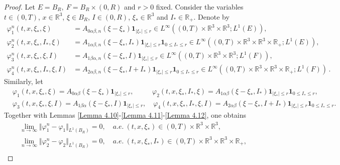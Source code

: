 \documentclass[10pt,a4paper]{amsart}
\def\R{\mathbb{R}}
\begin{document}
\begin{proof}

Let $E=B_R,\ F=B_R\times (0,R)$ and $r > 0$ fixed. Consider the variables $t \in (0, T)$, $x \in \R^3$, $\xi \in B_R$, $I \in (0, R)$, $\xi_* \in \R^3$ and $I_* \in \R_+$. Denote by
\begin{equation*}
	\begin{aligned}
		\varphi^n_1 (t, x, \xi_*, \xi) & = A_{0\alpha \beta ,n}(\xi -\xi_* ) \mathbf{1}_{|\xi_* |\leq r} \in L^\infty ((0,T)\times \R^3 \times \R^3; L^1(E)), \\
		\varphi^n_2 (t, x, \xi_*, I_*,\xi) & = A_{1\alpha \beta ,n}(\xi -\xi_* ,I_* ) \mathbf{1}_{|\xi_* |\leq r} \mathbf{1}_{0 \leq I_* \leq r} \in L^\infty ((0,T)\times \R^3 \times \R^3 \times \R_+; L^1(E)),\\
		\varphi^n_3 (t, x, \xi_*, \xi, I) & = A_{1\beta \alpha ,n}(\xi -\xi_* ,I) \mathbf{1}_{|\xi_* |\leq r} \in L^\infty ((0,T)\times \R^3 \times \R^3; L^1(F)), \\
		\varphi^n_4 (t, x, \xi_*, I_*, \xi, I) & = A_{2\alpha \beta ,n}(\xi -\xi_* ,I+I_* ) \mathbf{1}_{|\xi_* |\leq r} \mathbf{1}_{0 \leq I_* \leq r} \in L^\infty ((0,T)\times \R^3 \times \R^3\times \R_+; L^1(F)) \,.
	\end{aligned}
\end{equation*}
Similarly, let
\begin{equation*}
	\begin{aligned}
		& \varphi_1 (t, x, \xi_*, \xi) = A_{0\alpha \beta }(\xi -\xi_* ) \mathbf{1}_{|\xi_* |\leq r}, \quad \quad \ \ \, \varphi_2 (t, x, \xi_*, I_*, \xi ) = A_{1\alpha \beta }(\xi -\xi_* ,I_* ) \mathbf{1}_{|\xi_* |\leq r} \mathbf{1}_{0 \leq I_* \leq r}, \\
		&\varphi_3 (t, x, \xi_*, \xi, I) = A_{1\beta \alpha}(\xi -\xi_* ,I) \mathbf{1}_{|\xi_* |\leq r}, \quad \varphi_4 (t, x, \xi_*, I_*, \xi, I ) = A_{2\alpha \beta }(\xi -\xi_* ,I+I_* ) \mathbf{1}_{|\xi_* |\leq r} \mathbf{1}_{0 \leq I_* \leq r}.
	\end{aligned}
\end{equation*}
Together with Lemmas \ref{Lemma 4.10}-\ref{Lemma 4.11}-\ref{Lemma 4.12}, one obtains  
\begin{equation*}
	\begin{aligned}
		& \lim \limits_{n\rightarrow \infty } \Vert \varphi^n_1 -\varphi_1 \Vert_{L^1(B_R)}=0, \quad a.e. \ (t,x,\xi_*) \in (0,T) \times \R^3 \times \R^3, \\
		& \lim \limits_{n\rightarrow \infty } \Vert \varphi^n_2 -\varphi_2 \Vert_{L^1(B_R)}=0, \quad a.e. \ (t,x,\xi_* ,I_*) \in (0,T)\times \R^3 \times \R^3 \times \R_+, \\

\end{aligned}
\end{equation*}
\end{proof}
\end{document}
